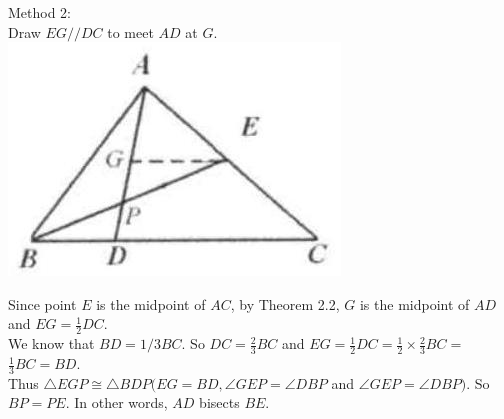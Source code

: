 \documentclass{article}
\begin{document}
Method 2:\\
Draw \(E G / / D C\) to meet \(A D\) at \(G\).\\
\centering
\includegraphics[width=\textwidth]{images/036(3).jpg}


Since point \(E\) is the midpoint of \(A C\), by Theorem 2.2, \(G\) is the midpoint of \(A D\) and \(E G=\frac{1}{2} D C\).\\
We know that \(B D=1 / 3 B C\). So \(D C=\frac{2}{3} B C\) and \(E G=\frac{1}{2} D C=\frac{1}{2} \times \frac{2}{3} B C=\) \(\frac{1}{3} B C=B D\).\\
Thus \(\triangle E G P \cong \triangle B D P(E G=B D, \angle G E P=\angle D B P\) and \(\angle G E P=\angle D B P)\). So \(B P=P E\). In other words, \(A D\) bisects \(B E\).
\end{document}
